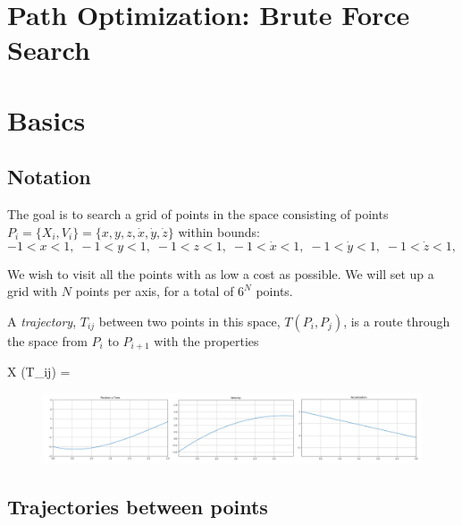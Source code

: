 \documentclass[letterpaper]{article}
\begin{document}
\section*{Path Optimization: Brute Force Search}

\section{Basics}

\subsection{Notation}
The goal is to search a grid of points in the  space consisting of points  $P_i = \{X_i, V_i\} = \{x,y,z,\dot{x},\dot{y},\dot{z}\}$ within bounds:
\[
-1 < x < 1, \;
-1 < y < 1, \;
-1 < z < 1, \;
-1 < \dot{x} < 1, \;
-1 < \dot{y} < 1, \;
-1 < \dot{z} < 1, \;
\]


We wish to visit all the points with as low a cost as possible.
We will set up a grid with $N$ points per axis, for a total of $6^N$ points.

A {\it trajectory}, $T_{ij}$ between two points in this space, $T(P_i,P_j)$, is a route through
the space from $P_i$ to $P_{i+1}$ with the properties

\beq \label{firstconstraint}
\Delta X (T_{ij}) = 
\eeq
%

\begin{figure}\centering
  \includegraphics[width=\textwidth]{computedTraj.png}
  \caption{}\label{basicTraj}
\end{figure}

%


\subsection{Trajectories between points}
\end{document}
